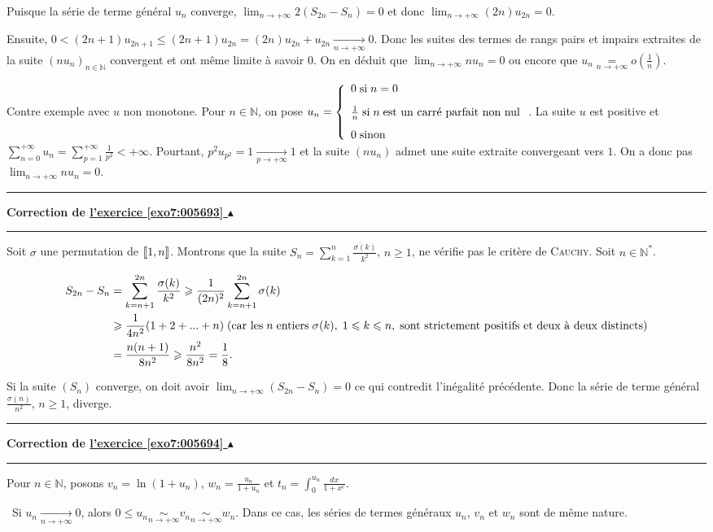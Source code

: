 \documentclass[11pt,a4paper]{article}
\newcommand{\Nn}{\mathbb{N}} \newcommand{\N}{\mathbb{N}}
\newcommand{\llbracket}{\left[\kern-0.15em\left[}
\newcommand{\rrbracket}{\right]\kern-0.15em\right]}
\newcounter{exo}
\newcommand{\correction}[1]{\hypertarget{cor7:#1}{}\label{cor7:#1}{\bf Correction de \hyperlink{exo7:#1}{l'exercice \ref{exo7:#1} $\blacktriangle$}}\vspace{1mm}\hrule\vspace{1mm}}
\newcommand{\fincorrection}{\vspace{1mm}\hrule\vspace*{7mm}}
\begin{document}
Puisque la série de terme général $u_n$ converge, $\lim_{n \rightarrow +\infty}2(S_{2n} - S_n)=0$ et donc $\lim_{n \rightarrow +\infty}(2n)u_{2n}=0$.

Ensuite, $0 < (2n+1)u_{2n+1}\leqslant(2n+1)u_{2n}=(2n)u_{2n}+u_{2n}\underset{n\rightarrow+\infty}{\rightarrow}0$. Donc les suites des termes de rangs pairs et impairs extraites de la suite $(nu_n)_{n\in\Nn}$ convergent et ont même limite à savoir $0$. On en déduit que $\lim_{n \rightarrow +\infty}nu_n=0$ ou encore que $u_n\underset{n\rightarrow+\infty}{=}o\left(\frac{1}{n}\right)$.

Contre exemple avec $u$ non monotone. Pour $n\in\Nn$, on pose $u_n=\left\{
\begin{array}{l}
0\;\text{si}\;n=0\\
\rule[-4mm]{0mm}{10mm}\frac{1}{n}\;\text{si}\;n\;\text{est un carré parfait non nul}\\
0\;\text{sinon}
\end{array}
\right.$. La suite $u$ est positive et $\sum_{n=0}^{+\infty}u_n=\sum_{p=1}^{+\infty}\frac{1}{p^2}<+\infty$. Pourtant, $p^2u_{p^2}=1\underset{p\rightarrow+\infty}{\rightarrow}1$ et la suite $(nu_n)$ admet une suite extraite convergeant vers $1$. On a donc pas $\lim_{n \rightarrow +\infty}nu_n=0$.
\fincorrection
\correction{005693}
Soit $\sigma$ une permutation de $\llbracket1,n\rrbracket$. Montrons que la suite $S_n=\sum_{k=1}^{n}\frac{\sigma(k)}{k^2}$, $n\geqslant1$, ne vérifie pas le critère de \textsc{Cauchy}. Soit $n\in\Nn^*$.

\begin{align*}\ensuremath
S_{2n}-S_n&=\sum_{k=n+1}^{2n}\frac{\sigma(k)}{k^2}\geqslant\frac{1}{(2n)^2}\sum_{k=n+1}^{2n}\sigma(k)\\
 &\geqslant\frac{1}{4n^2}(1+2+...+n)\;(\text{car les}\;n\;\text{entiers}\;\sigma(k),\;1\leqslant k\leqslant n,\;\text{sont strictement positifs et deux à deux distincts})\\
 &=\frac{n(n+1)}{8n^2}\geqslant\frac{n^2}{8n^2}=\frac{1}{8}.
\end{align*}

Si la suite $(S_n)$ converge, on doit avoir $\lim_{n \rightarrow +\infty}(S_{2n}-S_n)=0$ ce qui contredit l'inégalité précédente. Donc la série de terme général $\frac{\sigma(n)}{n^2}$, $n\geqslant1$, diverge.
\fincorrection
\correction{005694}
Pour $n\in\Nn$, posons $v_n=\ln(1+u_n)$, $w_n=\frac{u_n}{1+u_n}$ et $t_n=\int_{0}^{u_n}\frac{dx}{1+x^e}$.

\textbullet~Si $u_n\underset{n\rightarrow+\infty}{\rightarrow}0$, alors $0\leqslant u_n\underset{n\rightarrow+\infty}{\sim}v_n\underset{n\rightarrow+\infty}{\sim}w_n$. Dans ce cas, les séries de termes généraux $u_n$, $v_n$ et $w_n$ sont de même nature.
\end{document}
